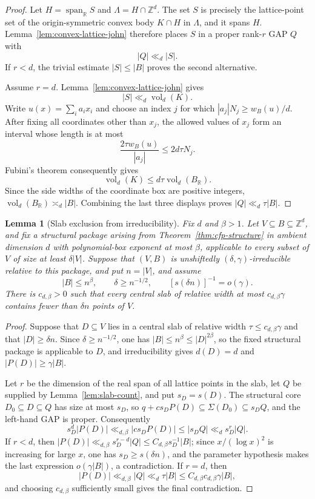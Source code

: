 \documentclass[11pt,reqno]{amsart}
\newtheorem{lemma}[theorem]{Lemma}
\theoremstyle{definition}
\theoremstyle{remark}
\newcommand{\Z}{\mathbb Z}
\newcommand{\R}{\mathbb R}
\newcommand{\Span}{\operatorname{span}}
\newcommand{\vol}{\operatorname{vol}}
\newcommand{\SigmaSet}{\Sigma}
\begin{document}
\begin{proof}
Let $H=\Span_{\R}S$ and $\Lambda=H\cap\Z^d$.  The set $S$ is precisely the
lattice-point set of the origin-symmetric convex body $K\cap H$ in
$\Lambda$, and it spans $H$.  Lemma~\ref{lem:convex-lattice-john} therefore
places $S$ in a proper rank-$r$ GAP $Q$ with
\[
 |Q|\ll_d|S|.
\]
If $r<d$, the trivial estimate $|S|\le|B|$ proves the second alternative.

Assume $r=d$.  Lemma~\ref{lem:convex-lattice-john} gives
\[
 |S|\ll_d\vol_d(K).
\]
Write $u(x)=\sum_i a_ix_i$ and choose an index $j$ for which
$|a_j|N_j\ge w_B(u)/d$.  After fixing all coordinates other than $x_j$,
the allowed values of $x_j$ form an interval whose length is at most
\[
 \frac{2\tau w_B(u)}{|a_j|}\le2d\tau N_j.
\]
Fubini's theorem consequently gives
\[
 \vol_d(K)\le d\tau\vol_d(B_{\R}).
\]
Since the side widths of the coordinate box are positive integers,
$\vol_d(B_{\R})\asymp_d|B|$.  Combining the last three displays proves
$|Q|\ll_d\tau|B|$.
\end{proof}

\begin{lemma}[Slab exclusion from irreducibility]
\label{lem:slab-exclusion}
Fix $d$ and $\beta>1$.  Let $V\subseteq B\subseteq\Z^d$, and fix a
structural package arising from Theorem~\ref{thm:cfp-structure} in ambient
dimension $d$ with polynomial-box exponent at most $\beta$, applicable to
every subset of $V$ of size at least $\delta|V|$.  Suppose that $(V,B)$ is
unshiftedly $(\delta,\gamma)$-irreducible relative to this package, and put
$n=|V|$, and assume
\[
 |B|\le n^\beta,
 \qquad
 \delta\ge n^{-1/2},
 \qquad
 [s(\delta n)]^{-1}=o(\gamma).
\]
There is $c_{d,\beta}>0$ such that every central slab of relative width at
most $c_{d,\beta}\gamma$ contains fewer than $\delta n$ points of $V$.
\end{lemma}

\begin{proof}
Suppose that $D\subseteq V$ lies in a central slab of relative width
$\tau\le c_{d,\beta}\gamma$ and that $|D|\ge\delta n$.  Since
$\delta\ge n^{-1/2}$, one has $|B|\le n^\beta\le|D|^{2\beta}$, so the
fixed structural package is applicable to $D$, and irreducibility gives
$d(D)=d$ and $|P(D)|\ge\gamma|B|$.

Let $r$ be the dimension of the real span of all lattice points in the
slab, let $Q$ be supplied by Lemma~\ref{lem:slab-count}, and put
$s_D=s(D)$.  The structural core $D_0\subseteq D\subseteq Q$ has size at
most $s_D$, so
$q+cs_DP(D)\subseteq\SigmaSet(D_0)\subseteq s_DQ$, and the left-hand
GAP is proper.  Consequently
\[
 s_D^d|P(D)|\ll_{d,\beta}|cs_DP(D)|
 \le |s_DQ|
 \ll_d s_D^r|Q|.
\]
If $r<d$, then
$|P(D)|\ll_{d,\beta}s_D^{r-d}|Q|\le C_{d,\beta}s_D^{-1}|B|$; since
$x/(\log x)^2$ is increasing for large $x$, one has
$s_D\ge s(\delta n)$, and the parameter hypothesis makes the last
expression $o(\gamma|B|)$, a contradiction.  If $r=d$, then
\[
 |P(D)|\ll_{d,\beta}|Q|
 \ll_d\tau|B|
 \le C_{d,\beta}c_{d,\beta}\gamma|B|,
\]
and choosing $c_{d,\beta}$ sufficiently small gives the final
contradiction.
\end{proof}
\end{document}
